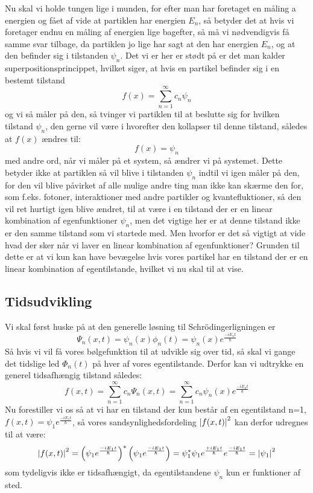 \documentclass[../Kvantemekanik.tex]{subfiles}
\begin{document}
Nu skal vi holde tungen lige i munden, for efter man har foretaget en måling a energien og fået af vide at partiklen har energien $E_n$, så betyder det at hvis vi foretager endnu en måling af energien lige bagefter, så må vi nødvendigvis få samme svar tilbage, da partiklen jo lige har sagt at den har energien $E_n$, og at den befinder sig i tilstanden $\psi_n$.
Det vi er her er stødt på er det man kalder superpositionsprincippet, hvilket siger, at hvis en partikel befinder sig i en bestemt tilstand
\begin{equation*}
    f(x)=\sum_{n=1}^{\infty}c_n\psi_n
\end{equation*}
og vi så måler på den, så tvinger vi partiklen til at beslutte sig for hvilken tilstand $\psi_n$, den gerne vil være i hvorefter den kollapser til denne tilstand, således at $f(x)$ ændres til:
\begin{equation*}
    f(x)=\psi_n
\end{equation*}
med andre ord, når vi måler på et system, så ændrer vi på systemet. Dette betyder ikke at partiklen så vil blive i tilstanden $\psi_n$ indtil vi igen måler på den, for den vil blive påvirket af alle mulige andre ting man ikke kan skærme den for, som f.eks. fotoner, interaktioner med andre partikler og kvantefluktioner, så den vil ret hurtigt igen blive ændret, til at være i en tilstand der er en linear kombination af egenfunktioner $\psi_n$, men det vigtige her er at denne tilstand ikke er den samme tilstand som vi startede med. 
Men hvorfor er det så vigtigt at vide hvad der sker når vi laver en linear kombination af egenfunktioner? Grunden til dette er at vi kun kan have bevægelse hvis vores partikel har en tilstand der er en linear kombination af egentilstande, hvilket vi nu skal til at vise.
\subsection{Tidsudvikling}
Vi skal først huske på at den generelle løsning til Schrödingerligningen er
$$\Psi_n(x,t)=\psi_n(x)\phi_n(t)=\psi_n(x)e^{\frac{-iE_nt}{\hbar}}$$
Så hvis vi vil få vores bølgefunktion til at udvikle sig over tid, så skal vi gange det tidslige led $\Phi_n(t)$ på hver af vores egentilstande. Derfor kan vi udtrykke en generel tidsafhængig tilstand således:
\begin{equation}
    f(x,t)=\sum_{n=1}^{\infty}c_n\Psi_n(x,t)=\sum_{n=1}^{\infty}c_n\psi_n(x)e^{\frac{-iE_nt}{\hbar}}
\end{equation}
Nu forestiller vi os så at vi har en tilstand der kun består af en egentilstand n=1, $f(x,t)=\psi_1e^{\frac{-iE_1t}{\hbar}}$, så vores sandsynlighedsfordeling $\left| f(x,t) \right|^2$ kan derfor udregnes til at være:
\begin{equation*}
    \left| f(x,t) \right|^2=\left(\psi_1e^{\frac{-iE_1t}{\hbar}}\right)^{*}\left(\psi_1e^{\frac{-iE_1t}{\hbar}}\right)=\psi_1^{*}\psi_1 e^{\frac{+iE_1t}{\hbar}}e^{\frac{-iE_1t}{\hbar}}=\left| \psi_1 \right|^{2}
\end{equation*}
som tydeligvis ikke er tidsafhængigt, da egentilstandene $\psi_n$ kun er funktioner af sted.
\end{document}
